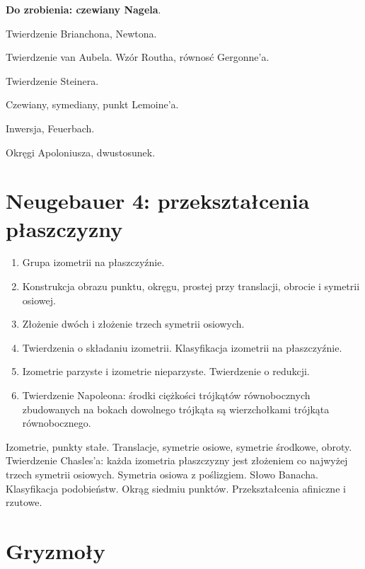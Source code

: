 \documentclass{parchment}
\begin{document}
\textbf{Do zrobienia: czewiany Nagela}.

Twierdzenie Brianchona, Newtona.

Twierdzenie van Aubela.
Wzór Routha, równosć Gergonne'a.

Twierdzenie Steinera.

Czewiany, symediany, punkt Lemoine'a.

Inwersja, Feuerbach.

Okręgi Apoloniusza, dwustosunek.

\chapter{Neugebauer 4: przekształcenia płaszczyzny}
\begin{enumerate}
	\item Grupa izometrii na płaszczyźnie.
	\item Konstrukcja obrazu punktu, okręgu, prostej przy translacji, obrocie i symetrii osiowej.
	\item Złożenie dwóch i złożenie trzech symetrii osiowych. 
	\item Twierdzenia o składaniu izometrii. Klasyfikacja izometrii na płaszczyźnie. 
	\item Izometrie parzyste i izometrie nieparzyste. Twierdzenie o redukcji.
	\item Twierdzenie Napoleona: środki ciężkości trójkątów równobocznych zbudowanych na bokach dowolnego trójkąta są wierzchołkami trójkąta równobocznego.
\end{enumerate}

Izometrie, punkty stałe.
Translacje, symetrie osiowe, symetrie środkowe, obroty.
Twierdzenie Chasles'a: każda izometria płaszczyzny jest złożeniem co najwyżej trzech symetrii osiowych.
Symetria osiowa z poślizgiem.
Słowo Banacha.
Klasyfikacja podobieństw.
Okrąg siedmiu punktów. %
Przekształcenia afiniczne i rzutowe.



\chapter{Gryzmoły}
\end{document}
